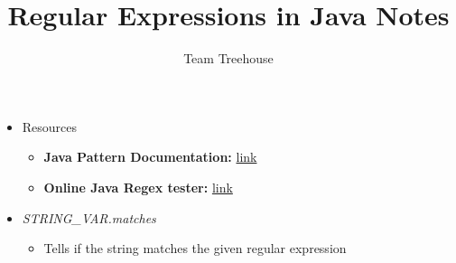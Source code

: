 \documentclass[12pt]{article}
\begin{document}
\title{Regular Expressions in Java Notes}
\author{Team Treehouse}
\maketitle

\begin{itemize}
    \item Resources
    \begin{itemize}
        \item \textbf{Java Pattern Documentation:} \href{https://docs.oracle.com/javase/8/docs/api/java/util/regex/Pattern.html}{link}
        \item \textbf{Online Java Regex tester:} \href{https://www.freeformatter.com/java-regex-tester.html}{link}
    \end{itemize}
    \item \textit{STRING\_VAR.matches}
    \begin{itemize}
        \item Tells if the string matches the given regular expression
    \end{itemize}


\end{itemize}
\end{document}
